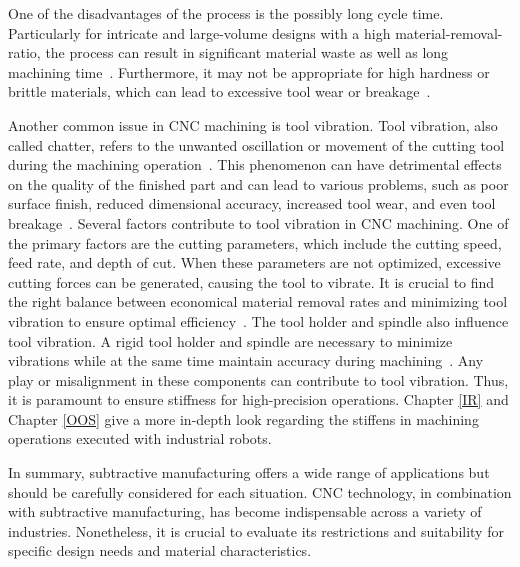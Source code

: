 One of the disadvantages of the process is the possibly long cycle time. Particularly for intricate and large-volume designs with a high material-removal-ratio, the process can result in significant material waste as well as long machining time~\cite{Faludi.2015}. Furthermore, it may not be appropriate for high hardness or brittle materials, which can lead to excessive tool wear or breakage~\cite{Hesser.2019}. 

Another common issue in \acrshort{CNC} machining is tool vibration. Tool vibration, also called chatter, refers to the unwanted oscillation or movement of the cutting tool during the machining operation~\cite{YUE.2019}. This phenomenon can have detrimental effects on the quality of the finished part and can lead to various problems, such as poor surface finish, reduced dimensional accuracy, increased tool wear, and even tool breakage~\cite{Aslan.2018}. Several factors contribute to tool vibration in \acrshort{CNC} machining. One of the primary factors are the cutting parameters, which include the cutting speed, feed rate, and depth of cut. When these parameters are not optimized, excessive cutting forces can be generated, causing the tool to vibrate. It is crucial to find the right balance between economical material removal rates and minimizing tool vibration to ensure optimal efficiency~\cite{GiorgioBort.2016}.
The tool holder and spindle also influence tool vibration. A rigid tool holder and spindle are necessary to minimize vibrations while at the same time maintain accuracy during machining~\cite{Wan.2019}. Any play or misalignment in these components can contribute to tool vibration. %
Thus, it is paramount to ensure stiffness for high-precision operations.
Chapter \ref{IR} and Chapter \ref{OOS} give a more in-depth look regarding the stiffens in machining operations executed with industrial robots.

In summary, subtractive manufacturing offers a wide range of applications but should be carefully considered for each situation. CNC technology, in combination with subtractive manufacturing, has become indispensable across a variety of industries. Nonetheless, it is crucial to evaluate its restrictions and suitability for specific design needs and material characteristics.

